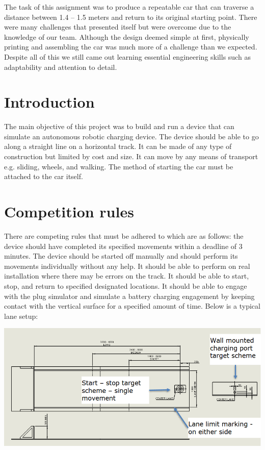 \documentclass{article}
\begin{document}
The task of this assignment was to produce a repeatable car that can traverse a distance between 1.4 – 1.5 meters and return to its original starting point. There were many challenges that presented itself but were overcome due to the knowledge of our team. Although the design deemed simple at first, physically printing and assembling the car was much more of a challenge than we expected. Despite all of this we still came out learning essential engineering skills such as adaptability and attention to detail. 

\newpage\vspace*{-20pt}
\section{Introduction}
The main objective of this project was to build and run a device that can simulate an autonomous robotic charging device. The device should be able to go along a straight line on a horizontal track. It can be made of any type of construction but limited by cost and size. It can move by any means of transport e.g. sliding, wheels, and walking. The method of starting the car must be attached to the car itself.  

\newpage\vspace*{-20pt}
\section{Competition rules}
There are competing rules that must be adhered to which are as follows: the device should have completed its specified movements within a deadline of 3 minutes. The device should be started off manually and should perform its movements individually without any help. It should be able to perform on real installation where there may be errors on the track. It should be able to start, stop, and return to specified designated locations. It should be able to engage with the plug simulator and simulate a battery charging engagement by keeping contact with the vertical surface for a specified amount of time.
Below is a typical lane setup:\\
\begin{center}
	\includegraphics[width=1\textwidth]{extracted_images/image_4_2.png}
\end{center}
\end{document}
